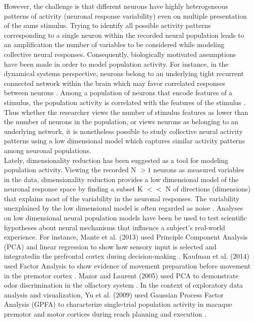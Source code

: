 However, the challenge is that different neurons have highly heterogeneous patterns of activity (neuronal response variability) even on multiple presentation of the same stimulus. Trying to identify all possible activity patterns  corresponding to  a single neuron within the recorded neural population leads to an amplification the number of variables to be considered while modeling collective neural responses. Consequently, biologically motivated assumptions have been made in order to model population activity. For instance, in the dynamical systems perspective, neurons belong to an underlying  tight recurrent connected network within the brain  which may favor correlated responses between neurons \cite{Shenoy2013}.
Among a population of neurons that encode features of a stimulus, the population activity is
correlated with the features of the stimulus \cite{Georgopoulos1982, Hubel1968}.
Thus whether the researcher views the number of stimulus features as lower than the number
of neurons in the population, or views neurons as belonging to an underlying network, it is nonetheless possible to study collective neural activity patterns using a low
dimensional model which captures similar activity patterns among neuronal populations.\\

Lately, dimensionality reduction has been suggested as a tool for modeling population activity. Viewing the recorded N $>1$ neurons as measured variables in the data, dimensionality reduction provides a low dimensional model of the neuronal response space by finding a subset K $<<$ N of directions (dimensions) that explains most of the variability in the neuronal responses. The variability unexplained by the low dimensional model is often regarded as noise \cite{Cunningham2014a}.  Analyses on low dimensional neural population models have been be used to test scientific hypotheses about neural mechanisms that influence a subject's real-world experience. For instance, Mante et al. (2013) used Principle Component Analysis (PCA) and linear regression to show how sensory input is selected and integratedin the prefrontal cortex during decision-making   \cite{Vos2015}.  Kaufman et al. (2014) used Factor Analysis to show evidence of movement preparation before movement in the premotor cortex \cite{Kaufman2014}.  Mazor and Laurent (2005)  used PCA to demonstrate odor discrimination in the olfactory system \cite{Mazor2005}. In the context of exploratory data analysis and visualization, Yu et al. (2009) used Gaussian Process Factor Analysis (GPFA) to characterize single-trial population activity in  macaque premotor and motor cortices during reach planning and execution  \cite{Yu2009} .\\

